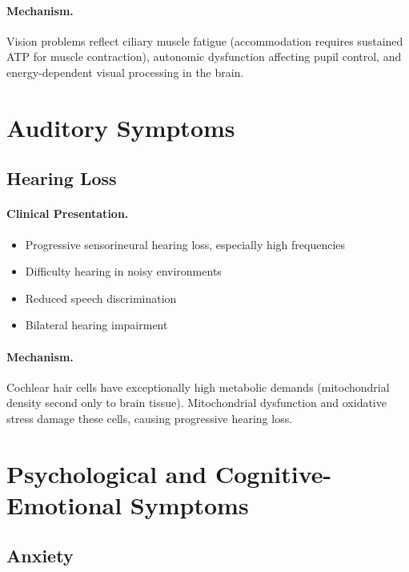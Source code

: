 \paragraph{Mechanism.}
Vision problems reflect ciliary muscle fatigue (accommodation requires sustained ATP for muscle contraction), autonomic dysfunction affecting pupil control, and energy-dependent visual processing in the brain.

\section{Auditory Symptoms}
\label{sec:auditory-symptoms}

\subsection{Hearing Loss}
\label{subsec:hearing-loss}

\paragraph{Clinical Presentation.}
\begin{itemize}
    \item Progressive sensorineural hearing loss, especially high frequencies
    \item Difficulty hearing in noisy environments
    \item Reduced speech discrimination
    \item Bilateral hearing impairment
\end{itemize}

\paragraph{Mechanism.}
Cochlear hair cells have exceptionally high metabolic demands (mitochondrial density second only to brain tissue). Mitochondrial dysfunction and oxidative stress damage these cells, causing progressive hearing loss.

\section{Psychological and Cognitive-Emotional Symptoms}
\label{sec:psychological}

\subsection{Anxiety}
\label{subsec:anxiety}

